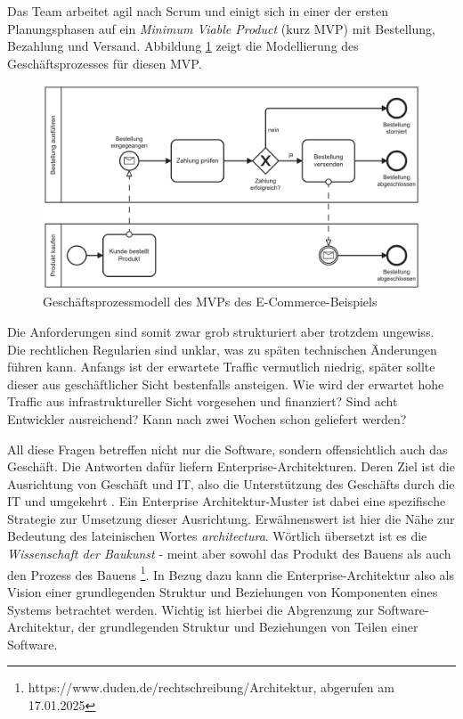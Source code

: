 \documentclass[acmtog]{acmart}
\begin{document}
Das Team arbeitet agil nach Scrum und einigt sich in einer der ersten Planungsphasen auf ein \textit{Minimum Viable Product} (kurz MVP) mit Bestellung, Bezahlung und Versand.
Abbildung \ref{fig:ecommerce-bpm} zeigt die Modellierung des Geschäftsprozesses für diesen MVP\@.
\begin{figure}[!h]
  \centering
  \includegraphics[width=\linewidth]{images/einleitung/ecommerce-order}
  \caption{Geschäftsprozessmodell des MVPs des E-Commerce-Beispiels}
  \label{fig:ecommerce-bpm}
\end{figure}
Die Anforderungen sind somit zwar grob strukturiert aber trotzdem ungewiss.
Die rechtlichen Regularien sind unklar, was zu späten technischen Änderungen führen kann.
Anfangs ist der erwartete Traffic vermutlich niedrig, später sollte dieser aus geschäftlicher Sicht bestenfalls ansteigen.
Wie wird der erwartet hohe Traffic aus infrastruktureller Sicht vorgesehen und finanziert?
Sind acht Entwickler ausreichend?
Kann nach zwei Wochen schon geliefert werden?

All diese Fragen betreffen nicht nur die Software, sondern offensichtlich auch das Geschäft.
Die Antworten dafür liefern Enterprise-Architekturen.
Deren Ziel ist die Ausrichtung von Geschäft und IT, also die Unterstützung des Geschäfts durch die IT und umgekehrt \cite{eaprinciples}.
Ein Enterprise Architektur-Muster ist dabei eine spezifische Strategie zur Umsetzung dieser Ausrichtung.
Erwähnenswert ist hier die Nähe zur Bedeutung des lateinischen Wortes \textit{architectura}.
Wörtlich übersetzt ist es die \textit{Wissenschaft der Baukunst} - meint aber sowohl das Produkt des Bauens als auch den Prozess des Bauens \footnote{https://www.duden.de/rechtschreibung/Architektur, abgerufen am 17.01.2025}.
In Bezug dazu kann die Enterprise-Architektur also als Vision einer grundlegenden Struktur und Beziehungen von Komponenten eines Systems betrachtet werden.
Wichtig ist hierbei die Abgrenzung zur Software-Architektur, der grundlegenden Struktur und Beziehungen von Teilen einer Software.
\end{document}
